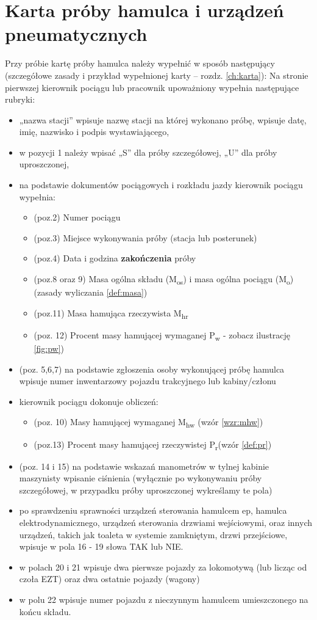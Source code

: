 \section{Karta próby hamulca i urządzeń pneumatycznych}
Przy próbie kartę próby hamulca należy wypełnić w sposób następujący (szczegółowe zasady i przykład wypełnionej karty – rozdz. \ref{ch:karta}):
Na stronie pierwszej kierownik pociągu lub pracownik upoważniony wypełnia następujące rubryki:
\begin{itemize}
	\item „nazwa stacji” wpisuje nazwę stacji na której wykonano próbę, wpisuje datę, imię, nazwisko i podpis wystawiającego,
	\item w pozycji 1 należy wpisać „S” dla próby szczegółowej, „U” dla próby uproszczonej,
	\item na podstawie dokumentów pociągowych i rozkładu jazdy kierownik pociągu wypełnia:
	\begin{itemize}
		\item (poz.2) Numer pociągu
		\item (poz.3) Miejsce wykonywania próby (stacja lub posterunek)
		\item (poz.4) Data i godzina \textbf{zakończenia} próby
		\item (poz.8 oraz 9) Masa ogólna składu (M\textsubscript{os}) i masa ogólna pociągu (M\textsubscript{o}) (zasady wyliczania \ref{def:masa})
		\item (poz.11) Masa hamująca rzeczywista M\textsubscript{hr}
		\item (poz. 12) Procent masy hamującej wymaganej P\textsubscript{w} - zobacz ilustrację \ref{fig:pw})
	\end{itemize}
	\item (poz. 5,6,7) na podstawie zgłoszenia osoby wykonującej próbę hamulca  wpisuje numer inwentarzowy pojazdu trakcyjnego lub kabiny/członu
	\item kierownik pociągu dokonuje obliczeń:
		\begin{itemize}
			\item (poz. 10) Masy hamującej wymaganej M\textsubscript{hw} (wzór \ref{wzr:mhw})
			\item (poz.13) Procent masy hamującej rzeczywistej P\textsubscript{r}(wzór \ref{def:pr})
		\end{itemize}
	\item (poz. 14 i 15) na podstawie wskazań manometrów w tylnej kabinie maszynisty wpisanie ciśnienia (wyłącznie po wykonywaniu próby szczegółowej, w przypadku próby uproszczonej wykreślamy te pola)
	\item po sprawdzeniu sprawności urządzeń sterowania hamulcem ep, hamulca elektrodynamicznego, urządzeń sterowania drzwiami wejściowymi, oraz innych urządzeń, takich jak toaleta w systemie zamkniętym, drzwi przejściowe, wpisuje w pola 16 - 19 słowa TAK lub NIE.
	\item w polach 20 i 21 wpisuje dwa pierwsze pojazdy za lokomotywą (lub licząc od czoła EZT) oraz dwa ostatnie pojazdy (wagony)
	\item w polu 22 wpisuje numer pojazdu z nieczynnym hamulcem umieszczonego na końcu składu.	
\end{itemize}

